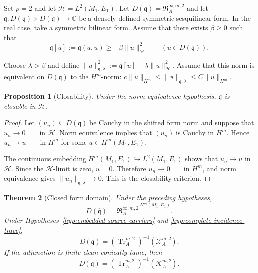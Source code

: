 \documentclass[11pt]{article}
\theoremstyle{plain}
\newtheorem{theorem}{Theorem}[section]
\newtheorem{proposition}[theorem]{Proposition}
\theoremstyle{definition}
\begin{document}
Set \(p=2\) and let
\(\mathcal H=L^2(M_1,E_1)\).
Let \(D(\mathfrak q) = \mathfrak R_A^{\infty;m,2}\) and let \(\mathfrak q: D(\mathfrak q)\times D(\mathfrak q) \longrightarrow \mathbb C\) be a densely defined symmetric sesquilinear form. In the real case,
take a symmetric bilinear form. Assume that there exists \(\beta\geq0\) such that
\[
  \mathfrak q[u]
  :=
  \mathfrak q(u,u)
  \geq
  -\beta\|u\|_{\mathcal H}^2
  \qquad
  (u\in D(\mathfrak q)).
\]

Choose \(\lambda>\beta\) and define
\(\|u\|_{\mathfrak q,\lambda}^2 := \mathfrak q[u] + \lambda\|u\|_{\mathcal H}^2\).
Assume that this norm is equivalent on \(D(\mathfrak q)\) to the
\(H^m\)-norm:
\(c\|u\|_{H^m} \leq \|u\|_{\mathfrak q,\lambda} \leq C\|u\|_{H^m}\).

\begin{proposition}[Closability]
\label{prop:form-closability}
Under the norm-equivalence hypothesis, \(\mathfrak q\) is closable in
\(\mathcal H\).
\end{proposition}

\begin{proof}
Let \((u_n)\subseteq D(\mathfrak q)\) be Cauchy in the shifted form
norm and suppose that
\(u_n\longrightarrow0 \qquad \text{in }\mathcal H\).
Norm equivalence implies that \((u_n)\) is Cauchy in \(H^m\). Hence \(u_n\longrightarrow u \qquad \text{in }H^m\) for some \(u\in H^m(M_1,E_1)\).

The continuous embedding \(H^m(M_1,E_1) \hookrightarrow L^2(M_1,E_1)\) shows that \(u_n\to u\) in \(\mathcal H\). Since the
\(\mathcal H\)-limit is zero,
\(u=0\).
Therefore
\(u_n\longrightarrow0 \qquad \text{in }H^m\),
and norm equivalence gives
\(\|u_n\|_{\mathfrak q,\lambda} \longrightarrow0\).
This is the closability criterion.
\end{proof}

\begin{theorem}[Closed form domain]
\label{thm:closed-form-domain}
Under the preceding hypotheses,
\[
  \boxed{
  D(\overline{\mathfrak q})
  =
  \overline{
    \mathfrak R_A^{\infty;m,2}
  }^{\,H^m(M_1,E_1)}.
  }
\]
Under
Hypotheses~\ref{hyp:embedded-source-carriers}
and \ref{hyp:complete-incidence-trace},
\[
  \boxed{
  D(\overline{\mathfrak q})
  =
  \left(
    \operatorname{Tr}_A^{m,2}
  \right)^{-1}
  \left(
    \mathcal X_A^{m,2}
  \right).
  }
\]
If the adjunction is finite clean conically tame, then
\[
  \boxed{
  D(\overline{\mathfrak q})
  =
  \left(
    \operatorname{Tr}_A^{m,2}
  \right)^{-1}
  \left(
    \mathcal K_A^{m,2}
  \right).
  }
\]
\end{theorem}
\end{document}

